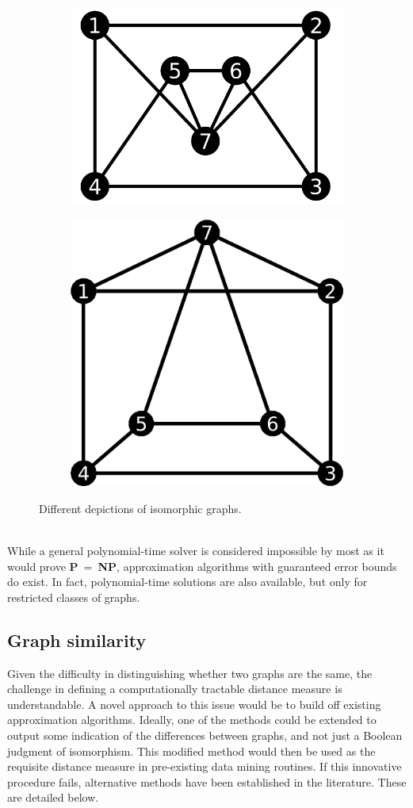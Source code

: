 \documentclass[11pt]{article}
\begin{document}
\begin{figure}[h!]
  \centering
  \begin{subfigure}{.5\textwidth}
    \centering
    \includegraphics[width=.65\linewidth]{graphA}
    \caption{}
    \label{fig:graphA}
  \end{subfigure}%
  \begin{subfigure}{.5\textwidth}
    \centering
    \includegraphics[width=.65\linewidth]{graphB}
    \caption{}
    \label{fig:graphB}
  \end{subfigure}%
  \caption{Different depictions of isomorphic graphs.}
  \label{fig:isoGraphs}
\end{figure}
\vspace{1mm}\\
While a general polynomial-time solver is considered impossible by most as it would prove \textbf{P}$ \ = \ $\textbf{NP}, approximation algorithms with guaranteed error bounds do exist. In fact, polynomial-time solutions are also available, but only for restricted classes of graphs.
\subsection{Graph similarity}
\label{subsec:GS}
\indent Given the difficulty in distinguishing whether two graphs are the same, the challenge in defining a computationally tractable distance measure is understandable. A novel approach to this issue would be to build off existing approximation algorithms. Ideally, one of the methods could be extended to output some indication of the differences between graphs, and not just a Boolean judgment of isomorphism. This modified method would then be used as the requisite distance measure in pre-existing data mining routines. If this innovative procedure fails, alternative methods have been established in the literature. These are detailed below.
\end{document}
